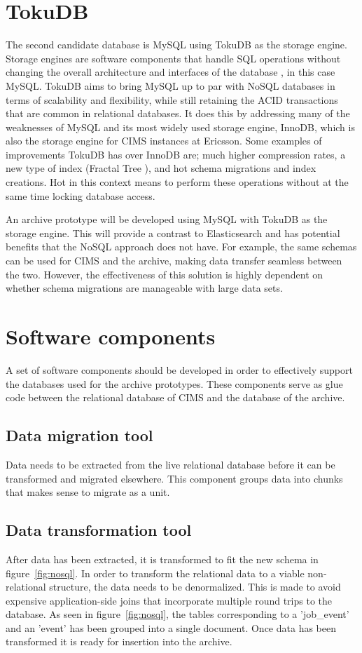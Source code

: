 \section{TokuDB}
\label{toku}
The second candidate database is MySQL using TokuDB \cite{tokudb} as the storage engine. Storage engines are software components that handle SQL operations without changing the overall architecture and interfaces of the database \cite{storageengine}, in this case MySQL. TokuDB aims to bring MySQL up to par with NoSQL databases in terms of scalability and flexibility, while still retaining the ACID transactions that are common in relational databases. It does this by addressing many of the weaknesses of MySQL and its most widely used storage engine, InnoDB, which is also the storage engine for CIMS instances at Ericsson. Some examples of improvements TokuDB has over InnoDB are; much higher compression rates, a new type of index (Fractal Tree \cite{fractaltree}), and hot schema migrations and index creations. Hot in this context means to perform these operations without at the same time locking database access.

An archive prototype will be developed using MySQL with TokuDB as the storage engine. This will provide a contrast to Elasticsearch and has potential benefits that the NoSQL approach does not have. For example, the same schemas can be used for CIMS and the archive, making data transfer seamless between the two. However, the effectiveness of this solution is highly dependent on whether schema migrations are manageable with large data sets.

\section{Software components}
A set of software components should be developed in order to effectively support the databases used for the archive prototypes. These components serve as glue code between the relational database of CIMS and the database of the archive. 
\subsection{Data migration tool}
Data needs to be extracted from the live relational database before it can be transformed and migrated elsewhere. This component groups data into chunks that makes sense to migrate as a unit. 

\subsection{Data transformation tool}
After data has been extracted, it is transformed to fit the new schema in figure~\ref{fig:nosql}. In order to transform the relational data to a viable non-relational structure, the data needs to be denormalized. This is made to avoid expensive application-side joins that incorporate multiple round trips to the database. As seen in figure~\ref{fig:nosql}, the tables corresponding to a 'job\_event' and an 'event' has been grouped into a single document. Once data has been transformed it is ready for insertion into the archive. 

